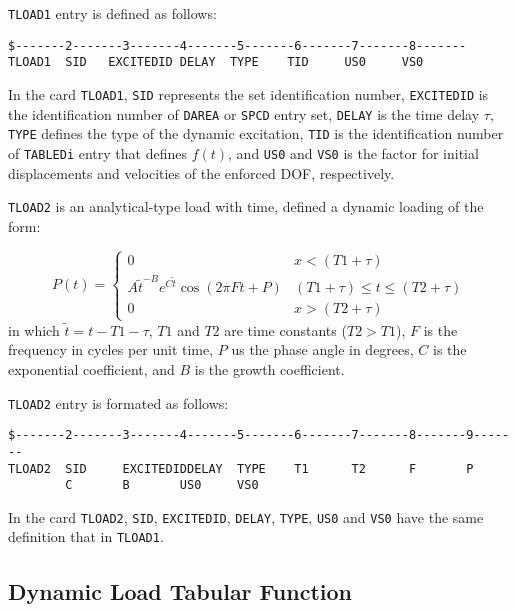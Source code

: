 \texttt{TLOAD1} entry is defined as follows:

\begin{lstlisting}
$-------2-------3-------4-------5-------6-------7-------8-------
TLOAD1  SID   EXCITEDID DELAY  TYPE    TID     US0     VS0
\end{lstlisting}

In the card \texttt{TLOAD1}, \texttt{SID} represents the set identification number, \texttt{EXCITEDID} is the identification number of \texttt{DAREA} or \texttt{SPCD} entry set, \texttt{DELAY} is the time delay $\tau$, \texttt{TYPE} defines the type of the dynamic excitation, \texttt{TID} is the identification number of \texttt{TABLEDi} entry that defines $f(t)$, and \texttt{US0} and \texttt{VS0} is the factor for initial displacements and velocities of the enforced DOF, respectively.

\texttt{TLOAD2} is an analytical-type load with time, defined a dynamic loading of the form:

\begin{equation}
    P(t) =
    \begin{cases} 
    0 & x < (T1 + \tau) \\
    A\tilde{t}^{-B}e^{C\tilde{t}} \cos(2 \pi F t + P) & (T1 + \tau) \leq t\leq (T2 + \tau) \\
    0 & x > (T2 + \tau)
    \end{cases}
\end{equation}
%    
in which $\tilde{t} =  t - T1 - \tau$, $T1$ and $T2$ are time constants ($T2 > T1$), $F$ is the frequency in cycles per unit time, $P$ us the phase angle in degrees, $C$ is the exponential coefficient, and $B$ is the growth coefficient.

\texttt{TLOAD2} entry is formated as follows:

\begin{lstlisting}
$-------2-------3-------4-------5-------6-------7-------8-------9-------
TLOAD2  SID     EXCITEDIDDELAY  TYPE    T1      T2      F       P
        C       B       US0     VS0
\end{lstlisting}

In the card \texttt{TLOAD2}, \texttt{SID}, \texttt{EXCITEDID}, \texttt{DELAY}, \texttt{TYPE}, \texttt{US0} and \texttt{VS0} have the same definition that in \texttt{TLOAD1}.

\subsection{Dynamic Load Tabular Function}

